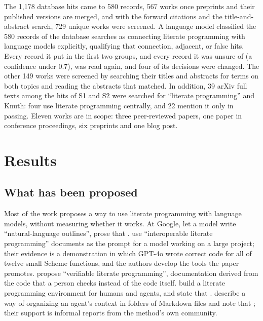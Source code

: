 The 1,178 database hits came to 580 records, 567 works once preprints and their
published versions are merged, and with the forward citations and the
title-and-abstract search, 729 unique works were screened.
A language model classified the 580 records of the database searches as
connecting literate programming with language models explicitly, qualifying
that connection, adjacent, or false hits.
Every record it put in the first two groups, and every record it was unsure of
(a confidence under 0.7), was read again, and four of its decisions were
changed.
The other 149 works were screened by searching their titles and abstracts for
terms on both topics and reading the abstracts that matched.
In addition, 39 arXiv full texts among the hits of S1 and S2 were searched for
\enquote{literate programming} and Knuth: four use literate programming
centrally, and 22 mention it only in passing.
Eleven works are in scope: three peer-reviewed papers, one paper in conference
proceedings, six preprints and one blog post.

\section{Results}
\label{sec:ai-rq1-results}

\subsection{What has been proposed}

Most of the work proposes a way to use literate programming with language
models, without measuring whether it works.
At Google, \textcite{Shi2025NLO} let a model write \enquote{natural-language
outlines}, prose that .
\Textcite{Zhang2024ILP} use \enquote{interoperable literate programming}
documents as the prompt for a model working on a large project; their evidence
is a demonstration in which GPT-4o wrote correct code for all of twelve small
Scheme functions, and the authors develop the tools the paper promotes.
\Textcite{Yuan2026VLP} propose \enquote{verifiable literate programming},
documentation derived from the code that a person checks instead of the code
itself.
\Textcite{Burke2026notlob} build a literate programming environment for humans
and agents, and state that .
\Textcite{VanClief2026ICM} describe a way of organizing an agent's context in
folders of Markdown files and note that ; their support is informal reports from the method's own
community.

